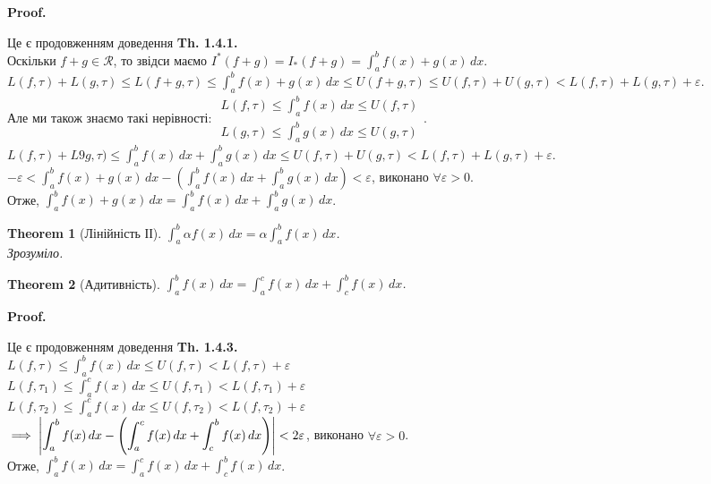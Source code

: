 \documentclass[a4paper, 10pt]{article}
\makeatletter
\def\huge{\displaystyle}
\def\qed{$\blacksquare$}
\theoremstyle{theoremdd}
\newtheorem{theorem}{Theorem}[subsection]
\theoremstyle{theoremdd}
\theoremstyle{theoremdd}
\theoremstyle{theoremdd}
\theoremstyle{theoremdd}
\theoremstyle{theoremdd}
\theoremstyle{theoremdd}
\theoremstyle{theoremdd}
\renewenvironment{proof}[1][Proof.\\]{\par
\pushQED{\hfill \qed}%
\normalfont \topsep6\p@\@plus6\p@\relax
\trivlist
\item\relax
{\bfseries
#1\@addpunct{.}}\hspace\labelsep\ignorespaces
}{%
\popQED\endtrivlist\@endpefalse
}
\makeatother
\begin{document}
\begin{proof}
Це є продовженням доведення \textbf{Th. 1.4.1.}\\
Оскільки $f+g \in \mathcal{R}$, то звідси маємо $I^*(f+g) = I_*(f+g) = \huge\int_a^b f(x)+g(x)\,dx$.\\
$L(f,\tau) + L(g,\tau) \leq L(f+g,\tau) \leq \huge\int_a^b f(x)+g(x)\,dx \leq U(f+g,\tau) \leq U(f, \tau) + U(g,\tau) < L(f,\tau) + L(g,\tau) + \varepsilon$.\\
Але ми також знаємо такі нерівності: $\begin{gathered}
L(f,\tau) \leq \huge\int_a^b f(x)\,dx \leq U(f, \tau)\\
L(g,\tau) \leq \huge\int_a^b g(x)\,dx \leq U(g,\tau)
\end{gathered}$.\\
$L(f,\tau) + L9g,\tau) \leq \huge\int_a^b f(x)\,dx + \int_a^b g(x)\,dx \leq U(f,\tau) + U(g,\tau) < L(f,\tau) + L(g,\tau) + \varepsilon$.\\
$-\varepsilon < \huge\int_a^b f(x)+g(x)\,dx - \left( \int_a^b f(x)\,dx + \int_a^b g(x)\,dx \right) < \varepsilon$, виконано $\forall \varepsilon > 0$.\\
Отже, $\huge\int_a^b f(x)+g(x)\,dx = \int_a^b f(x)\,dx + \int_a^b g(x)\,dx$.
\end{proof}

\begin{theorem}[Лінійність ІІ]
$\huge\int_a^b \alpha f(x)\,dx = \alpha \int_a^b f(x)\,dx$.\\
\textit{Зрозуміло.}
\end{theorem}

\begin{theorem}[Адитивність]
$\huge\int_a^b f(x)\,dx = \int_a^c f(x)\,dx + \int_c^b f(x)\,dx$.
\end{theorem}

\begin{proof}
Це є продовженням доведення \textbf{Th. 1.4.3.}\\
$L(f,\tau) \leq \huge\int_a^b f(x)\,dx \leq U(f, \tau) < L(f,\tau) + \varepsilon$\\
$L(f,\tau_1) \leq \huge\int_a^c f(x)\,dx \leq U(f,\tau_1) < L(f,\tau_1) + \varepsilon$\\
$L(f,\tau_2) \leq \huge\int_a^c f(x)\,dx \leq U(f,\tau_2) < L(f,\tau_2) + \varepsilon$\\
$\implies \abs{\huge\int_a^b f(x) \,dx - \left( \int_a^c f(x)\,dx + \int_c^b f(x)\,dx \right)} < 2\varepsilon$, виконано $\forall \varepsilon > 0$.\\
Отже, $\huge\int_a^b f(x)\,dx = \int_a^c f(x)\,dx + \int_c^b f(x)\,dx$.
\end{proof}
\end{document}

